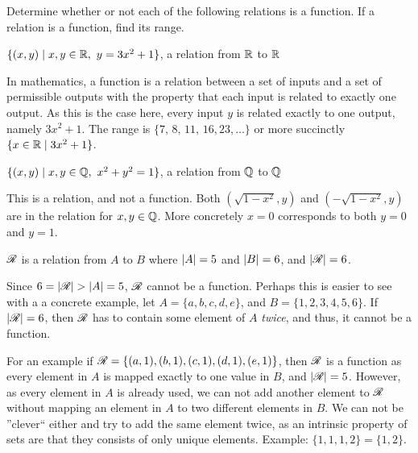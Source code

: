 \documentclass[a4paper, english, 12pt]{article} %
\begin{document}
\titlebox


\begin{problem}
  Determine whether or not each of the following relations is a function. If a
  relation is a function, find its range.
\end{problem}

\begin{subproblem}[3]
  $\{ (x, y) \mid x,y \in \mathbb{R}, \ y = 3x^2 + 1 \}$, a relation from $\mathbb{R}$ to $\mathbb{R}$
\end{subproblem}

\begin{answer}
  In mathematics, a function is a relation between a set of inputs and a set
  of permissible outputs with the property that each input is related to exactly
  one output.
  As this is the case here, every input $y$ is related exactly to one output,
  namely $3x^2 + 1$. The range is $\{7,\,8,\,11,\,16,23,\ldots\}$ or more
  succinctly $\{x \in \mathbb{R} \mid 3x^2 + 1\}$.
\end{answer}

\begin{subproblem}
  $\{ (x, y) \mid x,y \in \mathbb{Q}, \ x^2 + y^2 = 1 \}$, a relation from $\mathbb{Q}$ to $\mathbb{Q}$
\end{subproblem}

\begin{answer}
  This is a relation, and not a function. Both $(\sqrt{1-x^2}, y)$ and
  $(-\sqrt{1-x^2}, y)$ are in the relation for $x,y\in \mathbb{Q}$. More concretely
  $x=0$ corresponds to both $y=0$ and $y=1$. 
\end{answer}

\begin{subproblem}
  $\mathscr{R}$ is a relation from $A$ to $B$ where $\lvert A\rvert=5$ and $\lvert B\rvert=6$, and $\lvert\mathscr{R}\rvert=6$.
\end{subproblem}

\begin{answer}
  Since $6 = \lvert\mathscr{R}\rvert > \lvert A\rvert = 5$, $\mathscr{R}$ cannot be a function. Perhaps this
  is easier to see with a a concrete example, let $A = \{a,b,c,d,e\}$, and $B =
  \{1,2,3,4,5,6\}$. If $\lvert\mathscr{R}\rvert=6$, then $\mathscr{R}$ has to contain some element of
  $A$ \emph{twice}, and thus, it cannot be a function.

  For an example if
$\mathscr{R} = \{ (a,1), (b,1), (c,1), (d,1), (e,1) \}$, then $\mathscr{R}$ is a function as every
element in $A$ is mapped exactly to one value in $B$, and $\lvert\mathscr{R}\rvert= 5$.
However, as every element in $A$ is already used, we can not add another element
to $\mathscr{R}$ without mapping an element in $A$ to two different elements in $B$.
We can not be ''clever`` either and try to add the same element twice, as an intrinsic
property of sets are that they consists of only unique elements. Example:
$\{1,1,1,2\} = \{1,2\}$.
\end{answer}
\end{document}
